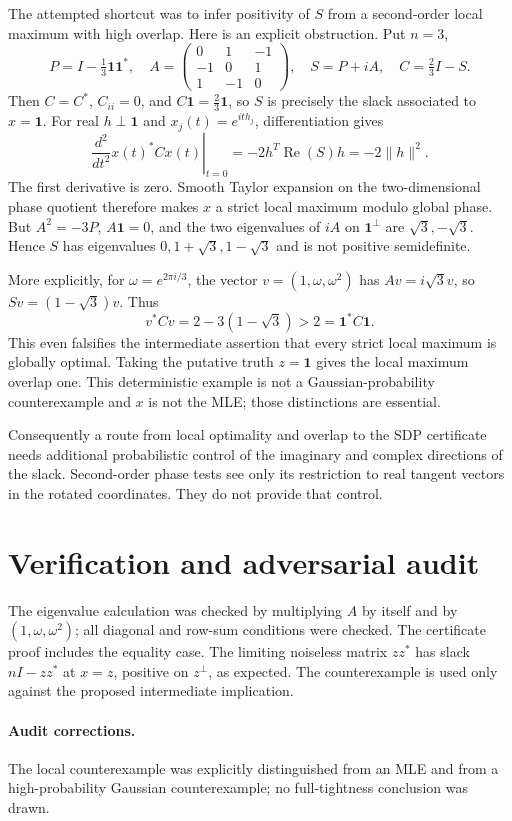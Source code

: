 \documentclass[11pt]{article}
\begin{document}
The attempted shortcut was to infer positivity of $S$ from a second-order local
maximum with high overlap. Here is an explicit obstruction. Put $n=3$,
\[
 P=I-\tfrac13\mathbf1\mathbf1^*,\quad
 A=\begin{pmatrix}0&1&-1\\-1&0&1\\1&-1&0\end{pmatrix},\quad
 S=P+iA,\quad C=\tfrac23 I-S.
\]
Then $C=C^*$, $C_{ii}=0$, and $C\mathbf1=\tfrac23\mathbf1$, so $S$ is precisely
the slack associated to $x=\mathbf1$. For real $h\perp\mathbf1$ and
$x_j(t)=e^{ith_j}$, differentiation gives
\[
 \left.\frac{d^2}{dt^2}x(t)^*Cx(t)\right|_{t=0}
 =-2h^T\operatorname{Re}(S)h=-2\|h\|^2.
\]
The first derivative is zero. Smooth Taylor expansion on the two-dimensional
phase quotient therefore makes $x$ a strict local maximum modulo global phase.
But $A^2=-3P$, $A\mathbf1=0$, and the two eigenvalues of $iA$ on
$\mathbf1^\perp$ are $\sqrt3,-\sqrt3$. Hence $S$ has eigenvalues
$0,1+\sqrt3,1-\sqrt3$ and is not positive semidefinite.

More explicitly, for $\omega=e^{2\pi i/3}$, the vector
$v=(1,\omega,\omega^2)$ has $Av=i\sqrt3v$, so
$Sv=(1-\sqrt3)v$. Thus
\[
 v^*Cv=2-3(1-\sqrt3)>2=\mathbf1^*C\mathbf1.
\]
This even falsifies the intermediate assertion that every strict local maximum
is globally optimal. Taking the putative truth $z=\mathbf1$ gives the local
maximum overlap one. This deterministic example is not a Gaussian-probability
counterexample and $x$ is not the MLE; those distinctions are essential.

Consequently a route from local optimality and overlap to the SDP certificate
needs additional probabilistic control of the imaginary and complex directions
of the slack. Second-order phase tests see only its restriction to real tangent
vectors in the rotated coordinates. They do not provide that control.
\section{Verification and adversarial audit}
The eigenvalue calculation was checked by multiplying $A$ by itself and by
$(1,\omega,\omega^2)$; all diagonal and row-sum conditions were checked. The
certificate proof includes the equality case. The limiting noiseless matrix
$zz^*$ has slack $nI-zz^*$ at $x=z$, positive on $z^\perp$, as expected.
The counterexample is used only against the proposed intermediate implication.
\paragraph{Audit corrections.} The local counterexample was explicitly distinguished from an MLE and from a high-probability Gaussian counterexample; no full-tightness conclusion was drawn.
\end{document}
